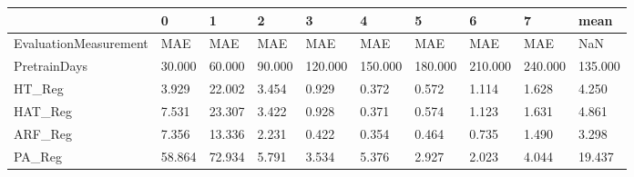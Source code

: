 \begin{tabular}{llllllllll}
\toprule
{} &      0 &      1 &      2 &       3 &       4 &       5 &       6 &       7 &    mean \\
\midrule
EvaluationMeasurement &    MAE &    MAE &    MAE &     MAE &     MAE &     MAE &     MAE &     MAE &     NaN \\
PretrainDays          & 30.000 & 60.000 & 90.000 & 120.000 & 150.000 & 180.000 & 210.000 & 240.000 & 135.000 \\
HT\_Reg                &  3.929 & 22.002 &  3.454 &   0.929 &   0.372 &   0.572 &   1.114 &   1.628 &   4.250 \\
HAT\_Reg               &  7.531 & 23.307 &  3.422 &   0.928 &   0.371 &   0.574 &   1.123 &   1.631 &   4.861 \\
ARF\_Reg               &  7.356 & 13.336 &  2.231 &   0.422 &   0.354 &   0.464 &   0.735 &   1.490 &   3.298 \\
PA\_Reg                & 58.864 & 72.934 &  5.791 &   3.534 &   5.376 &   2.927 &   2.023 &   4.044 &  19.437 \\
\bottomrule
\end{tabular}
